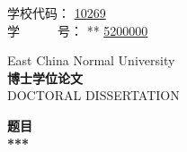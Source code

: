 \pagestyle{empty}


\hskip 4.6cm {{ 学校代码： {\large  \underline{10269\hspace{1.4cm}}}}}\\
\hskip 4.6cm  {{ 学~~~~~~号： {\large \ifpeerview ***\hspace{1.82cm} \else \underline{5200000}\fi}}}

\vskip 2cm

\begin{center}
\end{center}

\begin{center}
{  East China Normal University} \\
{\bf\songti{} 博士学位论文} \\
{  DOCTORAL DISSERTATION}
\end{center}

\vskip 1.5cm

\begin{center}
{\bf\songti{} 题目}\\[1em]
{\bf\songti{} ***}
\end{center}

